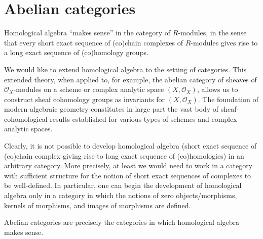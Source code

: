 

\section{Abelian categories}
\setcounter{theorem}{0}
\setcounter{equation}{0}


\renewcommand{\theenumi}{\roman{enumi}}
\renewcommand{\labelenumi}{\textnormal{(\theenumi)}$\;\;$}


Homological algebra ``makes sense'' in the category of $R$-modules,
in the sense that every short exact sequence of (co)chain complexes of $R$-modules
gives rise to a long exact sequence of (co)homology groups.

We would like to extend homological algebra to the setting of categories.
This extended theory, when applied to, for example,
the abelian category of sheaves of $\mathcal{O}_{X}$-modules
on a scheme or complex analytic space $(X,\mathcal{O}_{X})$,
allows us to construct sheaf cohomology groups as invariants for $(X,\mathcal{O}_{X})$.
The foundation of modern algebraic geometry constitutes in large part the vast body of sheaf-cohomological results established
for various types of schemes and complex analytic spaces.

Clearly, it is not possible to develop homological algebra
(short exact sequence of (co)chain complex giving rise to long exact sequence of (co)homologies)
in an arbitrary category.
More precisely, at least we would need to work in a category with sufficient structure
for the notion of short exact sequences of complexes to be well-defined.
In particular, one can begin the development of homological algebra only in a category
in which the notions of zero objects/morphisms, kernels of morphisms, and images of morphisms are defined.

Abelian categories are precisely the categories in which homological algebra makes sense.



